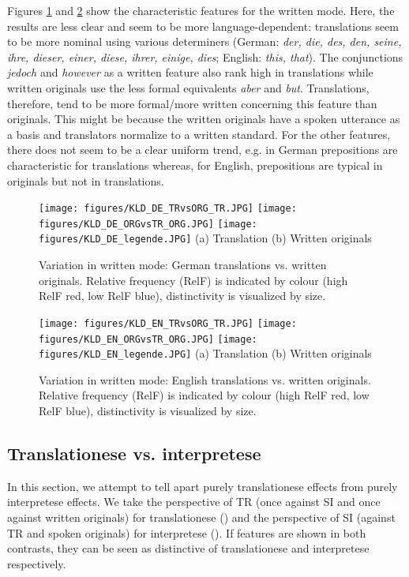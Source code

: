 \documentclass[output=paper,colorlinks,citecolor=brown]{langscibook}
\begin{document}
Figures \ref{fig: DE TR vs ORG} and \ref{fig: EN TR vs ORG} show the characteristic features for the written mode. Here, the results are less clear and seem to be more language-dependent: translations seem to be more nominal using various determiners (German: \textit{der, die, des, den, seine, ihre, dieser, einer, diese, ihrer, einige, dies}; English: \textit{this, that}). The conjunctions \textit{jedoch} and \textit{however} as a written feature also rank high in translations while written originals use the less formal equivalents \textit{aber} and \textit{but}. Translations, therefore, tend to be more formal/more written concerning this feature than originals. This might be because the written originals have a spoken utterance as a basis and translators normalize to a written standard.
For the other features, there does not seem to be a clear uniform trend, e.g. in German prepositions are characteristic for translations whereas, for English, prepositions are typical in originals but not in translations.


\begin{figure}
\texttt{[image: figures/KLD\_DE\_TRvsORG\_TR.JPG]}
\texttt{[image: figures/KLD\_DE\_ORGvsTR\_ORG.JPG]}
\texttt{[image: figures/KLD\_DE\_legende.JPG]}
(a) Translation \hspace{2cm} (b) Written originals
\caption{\label{fig: DE TR vs ORG} Variation in written mode: German translations vs. written originals. Relative frequency (RelF) is indicated by colour (high RelF red, low RelF blue), distinctivity is visualized by size.}
\end{figure}


\begin{figure}
\texttt{[image: figures/KLD\_EN\_TRvsORG\_TR.JPG]}
\texttt{[image: figures/KLD\_EN\_ORGvsTR\_ORG.JPG]}
\texttt{[image: figures/KLD\_EN\_legende.JPG]}
(a) Translation \hspace{2cm} (b) Written originals
\caption{\label{fig: EN TR vs ORG} Variation in written mode: English translations vs. written originals. Relative frequency (RelF) is indicated by colour (high RelF red, low RelF blue), distinctivity is visualized by size.}
\end{figure}


\subsection{Translationese vs. interpretese}
In this section, we attempt to tell apart purely translationese effects from purely interpretese effects. We take the perspective of TR (once against SI and once against written originals) for translationese () and the perspective of SI (against TR and spoken originals) for interpretese (). If features are shown in both contrasts, they can be seen as distinctive of translationese and interpretese respectively.
\end{document}

